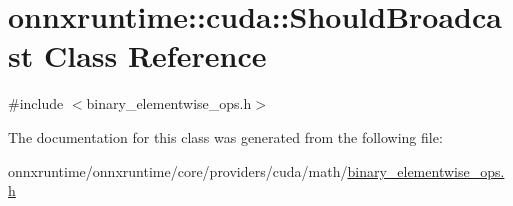 \hypertarget{classonnxruntime_1_1cuda_1_1ShouldBroadcast}{}\section{onnxruntime\+:\+:cuda\+:\+:Should\+Broadcast Class Reference}
\label{classonnxruntime_1_1cuda_1_1ShouldBroadcast}


{\ttfamily \#include $<$binary\+\_\+elementwise\+\_\+ops.\+h$>$}



The documentation for this class was generated from the following file\+:\begin{DoxyCompactItemize}
\item 
onnxruntime/onnxruntime/core/providers/cuda/math/\mbox{\hyperlink{binary__elementwise__ops_8h}{binary\+\_\+elementwise\+\_\+ops.\+h}}\end{DoxyCompactItemize}
